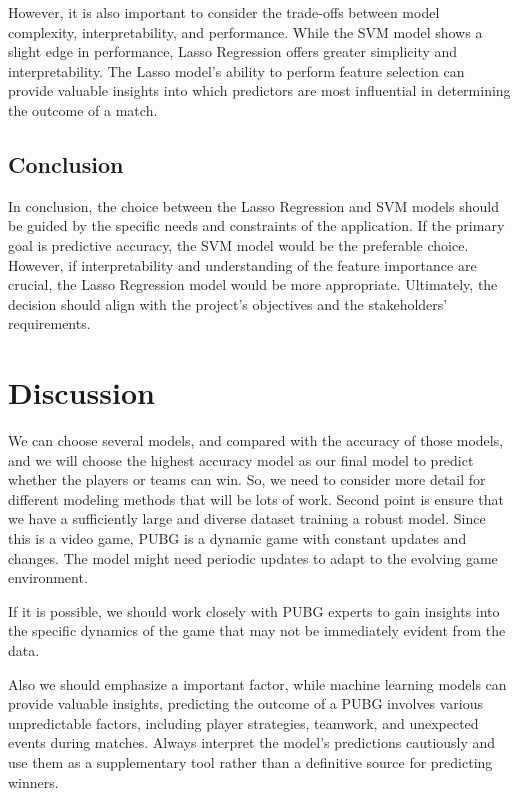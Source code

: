 \documentclass[12pt]{article}
\begin{document}
However, it is also important to consider the trade-offs between model complexity, interpretability, and performance. While the SVM model shows a slight edge in performance, Lasso Regression offers greater simplicity and interpretability. The Lasso model's ability to perform feature selection can provide valuable insights into which predictors are most influential in determining the outcome of a match.

\subsection{Conclusion}
In conclusion, the choice between the Lasso Regression and SVM models should be guided by the specific needs and constraints of the application. If the primary goal is predictive accuracy, the SVM model would be the preferable choice. However, if interpretability and understanding of the feature importance are crucial, the Lasso Regression model would be more appropriate. Ultimately, the decision should align with the project's objectives and the stakeholders' requirements.



\section{Discussion}
\label{sec:disc}

We can choose several models, and compared with the accuracy of those models, and we will choose the highest accuracy model as our final model to predict whether the players or teams can win. So, we need to consider more detail for different modeling methods that will be lots of work.
Second point is ensure that we have a sufficiently large and diverse dataset training a robust model.
Since this is a video game, PUBG is a dynamic game with constant updates and changes. The model might need periodic updates to adapt to the evolving game environment.

If it is possible, we should work closely with PUBG experts to gain insights into the specific dynamics of the game that may not be immediately evident from the data.

Also we should emphasize a important factor, while machine learning models can provide valuable insights, predicting the outcome of a PUBG  involves various unpredictable factors, including player strategies, teamwork, and unexpected events during matches. Always interpret the model's predictions cautiously and use them as a supplementary tool rather than a definitive source for predicting winners.
\end{document}
